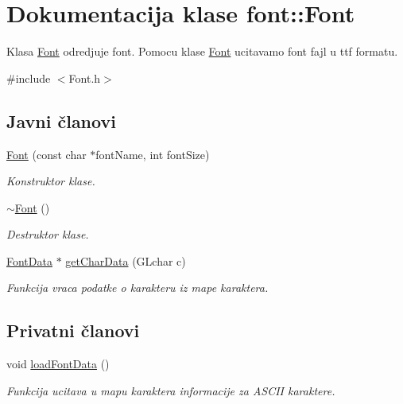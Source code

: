 \hypertarget{classfont_1_1Font}{}\section{Dokumentacija klase font\+:\+:Font}
\label{classfont_1_1Font}


Klasa \hyperlink{classfont_1_1Font}{Font} odredjuje font. Pomocu klase \hyperlink{classfont_1_1Font}{Font} ucitavamo font fajl u ttf formatu.  




{\ttfamily \#include $<$Font.\+h$>$}

\subsection*{Javni članovi}
\begin{DoxyCompactItemize}
\item 
\hyperlink{classfont_1_1Font_aed65c4302c3fe8426e60a6809ae766c1}{Font} (const char $\ast$font\+Name, int font\+Size)
\begin{DoxyCompactList}\small\item\em Konstruktor klase. \end{DoxyCompactList}\item 
\hyperlink{classfont_1_1Font_af5ef955edcbbcd84fc49510123b4037e}{$\sim$\+Font} ()
\begin{DoxyCompactList}\small\item\em Destruktor klase. \end{DoxyCompactList}\item 
\hyperlink{classfont_1_1FontData}{Font\+Data} $\ast$ \hyperlink{classfont_1_1Font_a7b63e5c88b80f597a2a334f44df001f0}{get\+Char\+Data} (G\+Lchar c)
\begin{DoxyCompactList}\small\item\em Funkcija vraca podatke o karakteru iz mape karaktera. \end{DoxyCompactList}\end{DoxyCompactItemize}
\subsection*{Privatni članovi}
\begin{DoxyCompactItemize}
\item 
void \hyperlink{classfont_1_1Font_af0e0a6951622786fe3175719e9b48590}{load\+Font\+Data} ()
\begin{DoxyCompactList}\small\item\em Funkcija ucitava u mapu karaktera informacije za A\+S\+C\+II karaktere. \end{DoxyCompactList}\end{DoxyCompactItemize}

